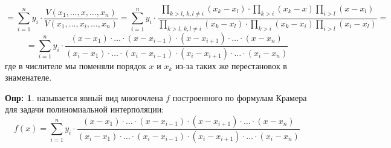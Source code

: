 \documentclass[12pt]{article}
\theoremstyle{definition}
\newtheorem{defn}{Опр:}
\newcommand{\ddsum}[2]{\displaystyle\sum\limits_{#1}^{#2}}
\begin{document}
$$
	=	\ddsum{i =1}{n}y_i{\cdot} \dfrac{V(x_1, \dotsc, x, \dotsc, x_n)}{V(x_1,\dotsc,x_i, \dotsc, x_n)} = 	\ddsum{i =1}{n}y_i{\cdot} \dfrac{\prod\limits_{k > l,\, k,l \neq i}(x_k - x_l){\cdot}\prod\limits_{k > i}(x_k - x)\prod\limits_{i > l}(x - x_l)}{\prod\limits_{k > l,\, k,l \neq i}(x_k - x_l){\cdot}\prod\limits_{k > i}(x_k - x_i)\prod\limits_{i > l}(x_i - x_l)} = 
$$
$$
	= \ddsum{i =1}{n}y_i{\cdot} \dfrac{(x - x_1){\cdot}\dotsc{\cdot}(x - x_{i-1}){\cdot}(x - x_{i +1}){\cdot}\dotsc{\cdot}(x - x_n)}{(x_i - x_1){\cdot}\dotsc{\cdot}(x_i - x_{i-1}){\cdot}(x_i - x_{i +1}){\cdot}\dotsc{\cdot}(x_i - x_n)}
$$
где в числителе мы поменяли порядок $x$ и $x_k$ из-за таких же перестановок в знаменателе.
\begin{defn}
	 называется явный вид многочлена $f$ построенного по формулам Крамера для задачи полиномиальной интерполяции:
	$$
		f(x) = \ddsum{i =1}{n}y_i{\cdot} \dfrac{(x - x_1){\cdot}\dotsc{\cdot}(x - x_{i-1}){\cdot}(x - x_{i +1}){\cdot}\dotsc{\cdot}(x - x_n)}{(x_i - x_1){\cdot}\dotsc{\cdot}(x_i - x_{i-1}){\cdot}(x_i - x_{i +1}){\cdot}\dotsc{\cdot}(x_i - x_n)}
	$$
\end{defn}
\end{document}
